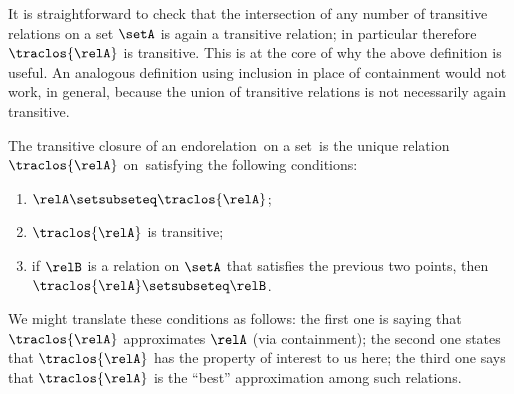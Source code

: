 \begin{remark}
It is straightforward to check that the intersection of any number of transitive relations on a set $\setA$ is again a transitive relation; in particular therefore $\traclos{\relA}$ is transitive. This is at the core of why the above definition is useful. An analogous definition using inclusion in place of containment would not work, in general, because the union of transitive relations is not necessarily again transitive. 
\end{remark}

\begin{remark}
The transitive closure of an endorelation~\relA on a set~\setA is the unique relation $\traclos{\relA}$ on~\setA satisfying the following conditions:
    \begin{enumerate}
        \item $\relA \setsubseteq \traclos{\relA}$;
        \item $\traclos{\relA}$ is transitive;
        \item if $\relB$ is a relation on $\setA$ that satisfies the previous two points, then $\traclos{\relA} \setsubseteq \relB$.
    \end{enumerate}
We might translate these conditions as follows: the first one is saying that $\traclos{\relA}$ approximates $\relA$ (via containment); the second one states that $\traclos{\relA}$ has the property of interest to us here; the third one says that $\traclos{\relA}$ is the ``best'' approximation among such relations. 
\end{remark}


